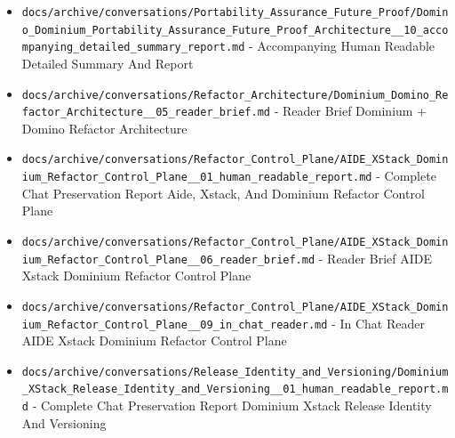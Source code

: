 \documentclass[10.5pt,a4paper,openany]{book}
\begin{document}
\begin{itemize}
\item \texttt{docs/\allowbreak{}archive/\allowbreak{}conversations/\allowbreak{}Portability\_\allowbreak{}Assurance\_\allowbreak{}Future\_\allowbreak{}Proof/\allowbreak{}Domino\_\allowbreak{}Dominium\_\allowbreak{}Portability\_\allowbreak{}Assurance\_\allowbreak{}Future\_\allowbreak{}Proof\_\allowbreak{}Architecture\_\allowbreak{}\_\allowbreak{}10\_\allowbreak{}accompanying\_\allowbreak{}detailed\_\allowbreak{}summary\_\allowbreak{}report.\allowbreak{}md} -\allowbreak{} Accompanying Human Readable Detailed Summary And Report
\item \texttt{docs/\allowbreak{}archive/\allowbreak{}conversations/\allowbreak{}Refactor\_\allowbreak{}Architecture/\allowbreak{}Dominium\_\allowbreak{}Domino\_\allowbreak{}Refactor\_\allowbreak{}Architecture\_\allowbreak{}\_\allowbreak{}05\_\allowbreak{}reader\_\allowbreak{}brief.\allowbreak{}md} -\allowbreak{} Reader Brief Dominium + Domino Refactor Architecture
\item \texttt{docs/\allowbreak{}archive/\allowbreak{}conversations/\allowbreak{}Refactor\_\allowbreak{}Control\_\allowbreak{}Plane/\allowbreak{}AIDE\_\allowbreak{}XStack\_\allowbreak{}Dominium\_\allowbreak{}Refactor\_\allowbreak{}Control\_\allowbreak{}Plane\_\allowbreak{}\_\allowbreak{}01\_\allowbreak{}human\_\allowbreak{}readable\_\allowbreak{}report.\allowbreak{}md} -\allowbreak{} Complete Chat Preservation Report Aide, Xstack, And Dominium Refactor Control Plane
\item \texttt{docs/\allowbreak{}archive/\allowbreak{}conversations/\allowbreak{}Refactor\_\allowbreak{}Control\_\allowbreak{}Plane/\allowbreak{}AIDE\_\allowbreak{}XStack\_\allowbreak{}Dominium\_\allowbreak{}Refactor\_\allowbreak{}Control\_\allowbreak{}Plane\_\allowbreak{}\_\allowbreak{}06\_\allowbreak{}reader\_\allowbreak{}brief.\allowbreak{}md} -\allowbreak{} Reader Brief AIDE Xstack Dominium Refactor Control Plane
\item \texttt{docs/\allowbreak{}archive/\allowbreak{}conversations/\allowbreak{}Refactor\_\allowbreak{}Control\_\allowbreak{}Plane/\allowbreak{}AIDE\_\allowbreak{}XStack\_\allowbreak{}Dominium\_\allowbreak{}Refactor\_\allowbreak{}Control\_\allowbreak{}Plane\_\allowbreak{}\_\allowbreak{}09\_\allowbreak{}in\_\allowbreak{}chat\_\allowbreak{}reader.\allowbreak{}md} -\allowbreak{} In Chat Reader AIDE Xstack Dominium Refactor Control Plane
\item \texttt{docs/\allowbreak{}archive/\allowbreak{}conversations/\allowbreak{}Release\_\allowbreak{}Identity\_\allowbreak{}and\_\allowbreak{}Versioning/\allowbreak{}Dominium\_\allowbreak{}XStack\_\allowbreak{}Release\_\allowbreak{}Identity\_\allowbreak{}and\_\allowbreak{}Versioning\_\allowbreak{}\_\allowbreak{}01\_\allowbreak{}human\_\allowbreak{}readable\_\allowbreak{}report.\allowbreak{}md} -\allowbreak{} Complete Chat Preservation Report Dominium Xstack Release Identity And Versioning

\end{itemize}
\end{document}
